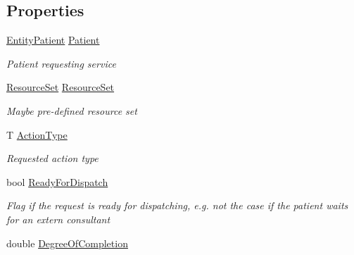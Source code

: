 \subsection*{Properties}
\begin{DoxyCompactItemize}
\item 
\hyperlink{class_general_health_care_elements_1_1_entities_1_1_entity_patient}{Entity\+Patient} \hyperlink{class_general_health_care_elements_1_1_activities_1_1_request_health_care_action_a3e8a540d0d49ee819f3bba4dc0bc3388}{Patient}
\begin{DoxyCompactList}\small\item\em Patient requesting service \end{DoxyCompactList}\item 
\hyperlink{class_general_health_care_elements_1_1_resource_handling_1_1_resource_set}{Resource\+Set} \hyperlink{class_general_health_care_elements_1_1_activities_1_1_request_health_care_action_a20639ff4451f5f416631615e442d088d}{Resource\+Set}
\begin{DoxyCompactList}\small\item\em Maybe pre-\/defined resource set \end{DoxyCompactList}\item 
T \hyperlink{class_general_health_care_elements_1_1_activities_1_1_request_health_care_action_a37a6d9369d02c1bfcc187df69af83e43}{Action\+Type}
\begin{DoxyCompactList}\small\item\em Requested action type \end{DoxyCompactList}\item 
bool \hyperlink{class_general_health_care_elements_1_1_activities_1_1_request_health_care_action_a70deb64e3122d0f5c0ffa523b3fb8643}{Ready\+For\+Dispatch}
\begin{DoxyCompactList}\small\item\em Flag if the request is ready for dispatching, e.\+g. not the case if the patient waits for an extern consultant \end{DoxyCompactList}\item 
double \hyperlink{class_general_health_care_elements_1_1_activities_1_1_request_health_care_action_a7ec8958080f63e3217f2b34a17838f98}{Degree\+Of\+Completion}

\end{DoxyCompactItemize}
